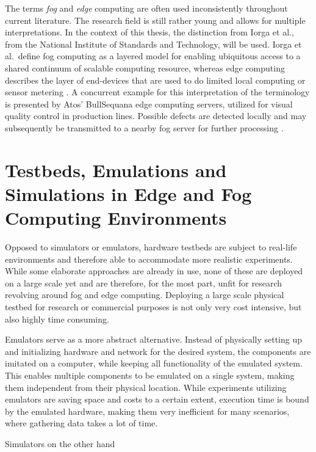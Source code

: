 The terms \emph{fog} and \emph{edge} computing are often used inconsistently
throughout current literature. The research field is still rather young and
allows for multiple interpretations. In the context of this thesis, the
distinction from Iorga et al., from the National Institute of Standards and
Technology, will be used. Iorga et al.\ define fog computing as a layered model
for enabling ubiquitous access to a shared continuum of scalable computing
resource, whereas edge computing describes the layer of end-devices that are
used to do limited local computing or sensor metering \cite{iorga2018}. A
concurrent example for this interpretation of the terminology is presented by
Atos' BullSequana edge computing servers, utilized for visual quality control in
production lines. Possible defects are detected locally and may subsequently be
transmitted to a nearby fog server for further processing \cite{atos2019,
atos2020}.

\section{Testbeds, Emulations and Simulations in Edge and Fog Computing Environments}
\label{sec:testbeds_emulations_and_simulations_in_edge_and_fog_computing_environments}

Opposed to simulators or emulators, hardware testbeds are subject to real-life
environments and therefore able to accommodate more realistic experiments. While
some elaborate approaches are already in use, none of these are deployed on a
large scale yet and are therefore, for the most part, unfit for research
revolving around fog and edge computing. Deploying a large scale physical
testbed for research or commercial purposes is not only very cost intensive, but
also highly time consuming.

Emulators serve as a more abstract alternative. Instead of physically setting up
and initializing hardware and network for the desired system, the components are
imitated on a computer, while keeping all functionality of the emulated system.
This enables multiple components to be emulated on a single system, making them
independent from their physical location. While experiments utilizing emulators
are saving space and costs to a certain extent, execution time is bound by the
emulated hardware, making them very inefficient for many scenarios, where
gathering data takes a lot of time.

Simulators on the other hand
\cite{svorobej2019}

